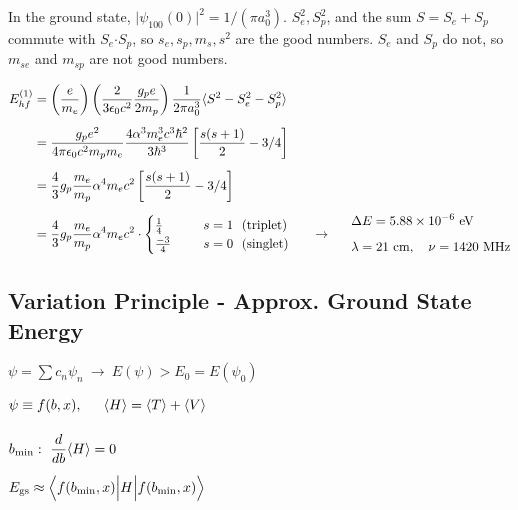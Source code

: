 \documentclass[12pt]{article}
\newcommand*{\dotP}{\boldsymbol \cdot}	%
\begin{document}
\vspace{20pt} \noindent
In the ground state, \(\big| \psi_{100}(0) \big|^2 = 1/(\pi a_0^3)\). \(S_e^2, S_p^2\), and the 
sum \(S=S_e + S_p\) commute with \(S_e \dotP S_p\), so \(s_e, s_p, m_s, s^2\) are the good numbers.
\(S_e\) and \(S_p\) do not, so \(m_{se}\) and \(m_{sp}\) are not good numbers.

\vspace{20pt}
\(\begin{aligned}
    E^{(1)}_{hf} &= \left(\frac{e}{m_e} \right) \left( \frac{2}{3\epsilon_0 c^2} \frac{g_p e}{2m_p} \right) 
        \frac{1}{2 \pi a_0^3} \langle S^2 - S^2_e - S^2_p \rangle \\[5pt]
    &= \frac{g_p e^2}{4 \pi \epsilon_0 c^2 m_p m_e} 
        \frac{4 \alpha^3 m_e^3 c^3 \hbar^2 }{3 \hbar^3} \left[ \frac{s(s+1)}{2} - 3/4 \right]\\[5pt]
    &= \frac{4}{3} g_p \frac{m_e}{m_p} \alpha^4 m_e c^2 \left[ \frac{s(s+1)}{2} - 3/4 \right]\\[5pt]
    &= \frac{4}{3} g_p \frac{m_e}{m_p} \alpha^4 m_e c^2 \cdot 
        \begin{cases}
            \frac{1}{4}     &   \indent s=1 \ \ (\text{triplet})\\
            \frac{-3}{4}    &   \indent s=0 \ \ (\text{singlet})
        \end{cases} \indent \rightarrow \indent \begin{aligned}
            &\Delta E = 5.88 \times 10^{-6} \text{\ eV} \\[5pt]
            &\lambda = 21 \text{\ cm}, \ \ \ \nu = 1420 \text{\ MHz}
        \end{aligned}
\end{aligned}\)

\newpage
\subsection{Variation Principle - Approx. Ground State Energy}

\(\psi = \sum c_n \psi_n \ \rightarrow \ E(\psi) > E_0 = E(\psi_0)\)

\vspace{10pt}
\indent \(\begin{aligned}
    &\psi \equiv f(b,x), \indent \langle H \rangle 
        = \langle T \rangle + \langle V \rangle\\[10pt]
    &b_\text{min}: \ \frac{d}{db} \langle H \rangle = 0 \\[5pt]
    &E_\text{gs} \approx 
        \Big\langle f(b_\text{min}, x) \Big| H \Big| f(b_\text{min}, x) \Big\rangle
\end{aligned}\)
\end{document}
